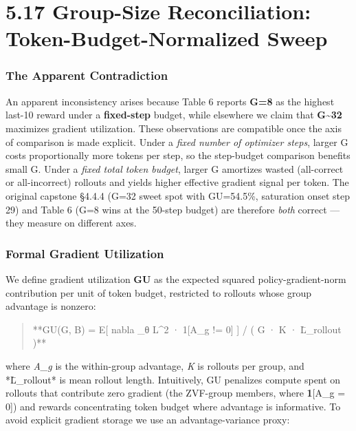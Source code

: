 \documentclass[
  american,
  11pt,
  a4paper,
  oneside]{report}
\begin{document}
\section{5.17 Group-Size Reconciliation: Token-Budget-Normalized
Sweep}\label{group-size-reconciliation-token-budget-normalized-sweep}

\subsubsection{The Apparent
Contradiction}\label{the-apparent-contradiction}

An apparent inconsistency arises because Table 6 reports \textbf{G=8} as
the highest last-10 reward under a \textbf{fixed-step} budget, while
elsewhere we claim that \textbf{G\textasciitilde32} maximizes gradient
utilization. These observations are compatible once the axis of
comparison is made explicit. Under a \emph{fixed number of optimizer
steps}, larger G costs proportionally more tokens per step, so the
step-budget comparison benefits small G. Under a \emph{fixed total token
budget}, larger G amortizes wasted (all-correct or all-incorrect)
rollouts and yields higher effective gradient signal per token. The
original capstone §4.4.4 (G=32 sweet spot with GU=54.5\%, saturation
onset step 29) and Table 6 (G=8 wins at the 50-step budget) are
therefore \emph{both} correct --- they measure on different axes.

\subsubsection{Formal Gradient
Utilization}\label{formal-gradient-utilization}

We define gradient utilization \textbf{GU} as the expected squared
policy-gradient-norm contribution per unit of token budget, restricted
to rollouts whose group advantage is nonzero:

\begin{quote}
**GU(G, B) = E{[} \textbar\textbar nabla \_θ L\textbar\textbar\^{}2 ·
1{[}A\_g != 0{]} {]} / ( G · K · L̄\_rollout )**
\end{quote}

where \emph{A\_g} is the within-group advantage, \emph{K} is rollouts
per group, and *L̄\_rollout* is mean rollout length. Intuitively, GU
penalizes compute spent on rollouts that contribute zero gradient (the
ZVF-group members, where \textbf{1}{[}A\_g = 0{]}) and rewards
concentrating token budget where advantage is informative. To avoid
explicit gradient storage we use an advantage-variance proxy:
\end{document}
